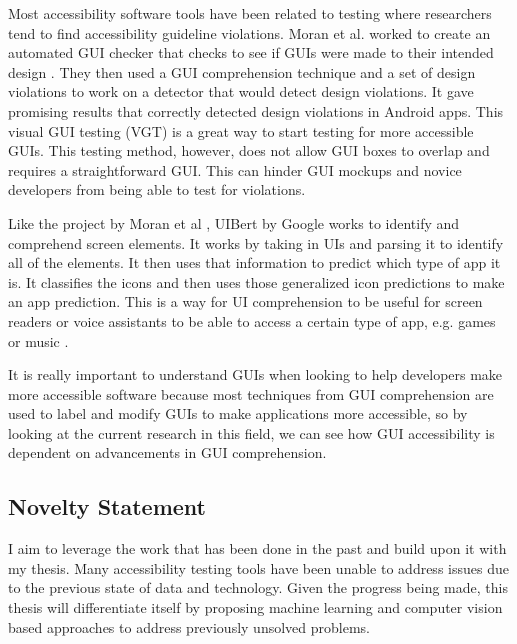 Most accessibility software tools have been related to testing where researchers tend to find accessibility guideline violations. Moran et al. \cite{Moran18} worked to create an automated GUI checker that checks to see if GUIs were made to their intended design \cite{Moran18}. They then used a GUI comprehension technique and a set of design violations to work on a detector that would detect design violations. It gave promising results that correctly detected design violations in Android apps. This visual GUI testing (VGT) is a great way to start testing for more accessible GUIs. This testing method, however, does not allow GUI boxes to overlap and requires a straightforward GUI. This can hinder GUI mockups and novice developers from being able to test for violations. 

Like the project by Moran et al \cite{Moran18}, UIBert by Google \cite{bai2021uibert} works to identify and comprehend screen elements. It works by taking in UIs and parsing it to identify all of the elements. It then uses that information to predict which type of app it is. It classifies the icons and then uses those generalized icon predictions to make an app prediction. This is a way for UI comprehension to be useful for screen readers or voice assistants to be able to access a certain type of app, e.g. games or music \cite{bai2021uibert}.  

It is really important to understand GUIs when looking to help developers make more accessible software because most techniques from GUI comprehension are used to label and modify GUIs to make applications more accessible, so by looking at the current research in this field, we can see how GUI accessibility is dependent on advancements in GUI comprehension. 

\subsection{Novelty Statement}

I aim to leverage the work that has been done in the past and build upon it with my thesis. Many accessibility testing tools have been unable to address issues due to the previous state of data and technology. Given the progress being made, this thesis will differentiate itself by proposing machine learning and computer vision based approaches to address previously unsolved problems. 


























